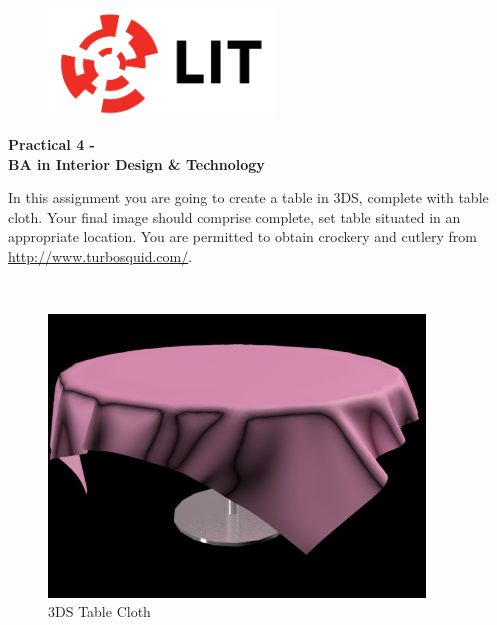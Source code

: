 


\newpage
\setcounter{page}{1}
\begin{center}
	\begin{figure}[ht]
		\centering
		\includegraphics[width = 6cm]{img/LITlogo.jpg}
		\label{fig:logoa4}
	\end{figure}
	\Large\textbf{Practical 4 - }\\
	\large\textbf{BA in Interior Design \& Technology}
\end{center}

In this assignment you are going to create a table in 3DS, complete with table cloth.  Your final image should comprise complete, set table situated in an appropriate location.  You are permitted to obtain crockery and cutlery from \href{http://www.turbosquid.com/}{http://www.turbosquid.com/}.

\\
\begin{figure}[h]
	\centering
		\includegraphics[width = 10cm]{img/p4Table.jpg}
	\caption{3DS Table Cloth}
	\label{fig:p4Table}
\end{figure}


